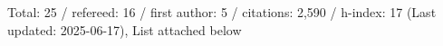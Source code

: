 Total: 25 / refereed: 16 / first author: 5 / citations: 2,590 / h-index: 17 (Last updated: 2025-06-17), List attached below